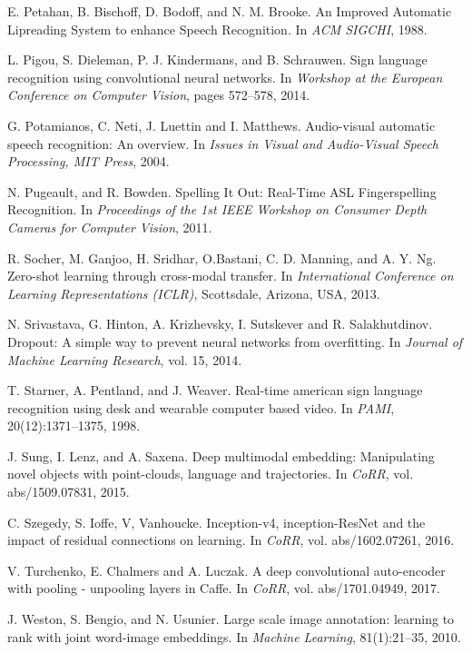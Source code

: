 \begin{thebibliography}{99}
  E. Petahan, B. Bischoff, D. Bodoff, and N. M. Brooke. An Improved
  Automatic Lipreading System to enhance Speech Recognition.
  In \textit{ACM SIGCHI}, 1988.

 L. Pigou, S. Dieleman, P. J. Kindermans, and B. Schrauwen.
  Sign language recognition using convolutional neural networks. In
  \textit{Workshop at the European Conference on Computer Vision},
  pages 572--578, 2014.

  G. Potamianos, C. Neti, J. Luettin and  I. Matthews. Audio-visual
  automatic speech recognition: An overview. In \textit{Issues in Visual
  and Audio-Visual Speech Processing, MIT Press}, 2004.

  N. Pugeault, and R. Bowden. Spelling It Out: Real-Time ASL
  Fingerspelling Recognition. In \textit{Proceedings of the 1st IEEE
  Workshop on Consumer Depth Cameras for Computer Vision}, 2011.

  R. Socher, M. Ganjoo, H. Sridhar, O.Bastani, C. D. Manning, and
  A. Y. Ng. Zero-shot learning through cross-modal transfer.
  In \textit{International Conference on Learning Representations (ICLR)},
  Scottsdale, Arizona, USA, 2013.

  N. Srivastava, G. Hinton, A. Krizhevsky, I. Sutskever and R. Salakhutdinov.
  Dropout: A simple way to prevent neural networks from overfitting. In
  \textit{Journal of Machine Learning Research}, vol. 15, 2014.

  T. Starner, A. Pentland, and J. Weaver. Real-time american sign language
  recognition using desk and wearable computer based video. 
  In \textit{PAMI}, 20(12):1371–1375, 1998.

  J. Sung, I. Lenz, and A. Saxena. Deep multimodal embedding:
  Manipulating novel objects with point-clouds, language and trajectories.
  In \textit{CoRR}, vol. abs/1509.07831, 2015.

  C. Szegedy, S. Ioffe, V, Vanhoucke. Inception-v4, inception-ResNet and the
  impact of residual connections on learning. In \textit{CoRR},
  vol. abs/1602.07261, 2016.

  V. Turchenko, E. Chalmers and A. Luczak. A deep convolutional auto-encoder
  with pooling - unpooling layers in Caffe. In \textit{CoRR},
  vol. abs/1701.04949, 2017.

  J. Weston, S. Bengio, and N. Usunier. 
  Large scale image annotation: learning to rank with joint word-image
  embeddings. In \textit{Machine Learning}, 81(1):21--35, 2010.


\end{thebibliography}
